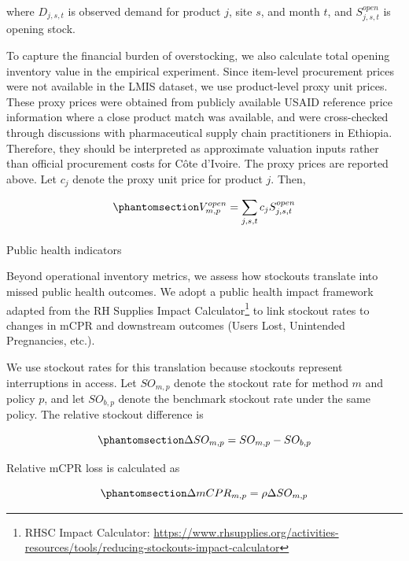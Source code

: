 \documentclass[
  authoryear,
  doubleblind,
  3p]{elsarticle}
\makeatletter
\let\oldparagraph\paragraph
\renewcommand{\paragraph}{
    \@ifstar
      \xxxParagraphStar
      \xxxParagraphNoStar
  }
\newcommand{\xxxParagraphStar}[1]{\oldparagraph*{#1}\mbox{}}
\newcommand{\xxxParagraphNoStar}[1]{\oldparagraph{#1}\mbox{}}
\makeatother
\begin{document}
where \(D_{j,s,t}\) is observed demand for product \(j\), site \(s\),
and month \(t\), and \(S_{j,s,t}^{open}\) is opening stock.

To capture the financial burden of overstocking, we also calculate total
opening inventory value in the empirical experiment. Since item-level
procurement prices were not available in the LMIS dataset, we use
product-level proxy unit prices. These proxy prices were obtained from
publicly available USAID reference price information
\citep{rosen2018modeling} where a close product match was available, and
were cross-checked through discussions with pharmaceutical supply chain
practitioners in Ethiopia. Therefore, they should be interpreted as
approximate valuation inputs rather than official procurement costs for
Côte d'Ivoire. The proxy prices are reported above. Let \(c_j\) denote
the proxy unit price for product \(j\). Then,

\begin{equation}\phantomsection\label{eq-inv_val}{
V^{open}_{m,p} =
\sum_{j,s,t} c_j S_{j,s,t}^{open}
}\end{equation}

\paragraph{Public health indicators}\label{public-health-indicators-1}

Beyond operational inventory metrics, we assess how stockouts translate
into missed public health outcomes. We adopt a public health impact
framework adapted from the RH Supplies Impact Calculator\footnote{RHSC
  Impact Calculator:
  \url{https://www.rhsupplies.org/activities-resources/tools/reducing-stockouts-impact-calculator}}
to link stockout rates to changes in mCPR and downstream outcomes (Users
Lost, Unintended Pregnancies, etc.).

We use stockout rates for this translation because stockouts represent
interruptions in access. Let \(SO_{m,p}\) denote the stockout rate for
method \(m\) and policy \(p\), and let \(SO_{b,p}\) denote the benchmark
stockout rate under the same policy. The relative stockout difference is

\begin{equation}\phantomsection\label{eq-so}{
\Delta SO_{m,p} = SO_{m,p} - SO_{b,p}
}\end{equation}

Relative mCPR loss is calculated as

\begin{equation}\phantomsection\label{eq-mcpr}{
\Delta mCPR_{m,p} = \rho  \Delta SO_{m,p}
}\end{equation}
\end{document}
